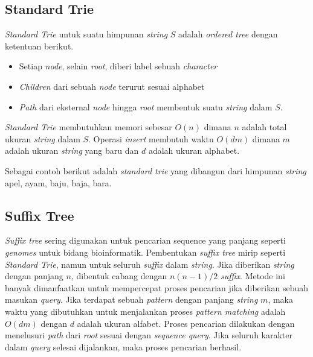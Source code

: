 \subsection{Standard Trie}
\textit{Standard Trie} untuk suatu himpunan \textit{string} $S$ adalah \textit{ordered tree} dengan ketentuan berikut.
\begin{itemize}
  \item Setiap \textit{node}, selain \textit{root}, diberi label sebuah \textit{character}
  \item \textit{Children} dari sebuah \textit{node} terurut sesuai alphabet
  \item \textit{Path} dari eksternal \textit{node} hingga \textit{root} membentuk suatu \textit{string} dalam $S$.
\end{itemize}
\textit{Standard Trie} membutuhkan memori sebesar $O(n)$ dimana $n$ adalah total ukuran \textit{string} dalam $S$. Operasi \textit{insert} membutuh waktu $O(dm)$ dimana $m$ adalah ukuran \textit{string} yang baru dan $d$ adalah ukuran alphabet.

Sebagai contoh berikut adalah \textit{standard trie} yang dibangun dari himpunan \textit{string} {apel, ayam, baju, baja, bara}.

\subsection{Suffix Tree}
\textit{Suffix tree} sering digunakan untuk pencarian sequence yang panjang seperti \textit{genomes} untuk bidang bioinformatik. Pembentukan \textit{suffix tree} mirip seperti \textit{Standard Trie}, namun untuk seluruh \textit{suffix} dalam \textit{string}. Jika diberikan \textit{string} dengan panjang $n$, dibentuk cabang dengan $n(n-1)/2$ \textit{suffix}.  Metode ini banyak dimanfaatkan untuk mempercepat proses pencarian jika diberikan sebuah masukan \textit{query}. Jika terdapat sebuah \textit{pattern} dengan panjang \textit{string} $m$, maka waktu yang dibutuhkan untuk menjalankan proses \textit{pattern matching} adalah $O(dm)$ dengan $d$ adalah ukuran alfabet. Proses pencarian dilakukan dengan menelusuri \textit{path} dari \textit{root} sesuai dengan \textit{sequence query}. Jika seluruh karakter dalam \textit{query} selesai dijalankan, maka proses pencarian berhasil. 

